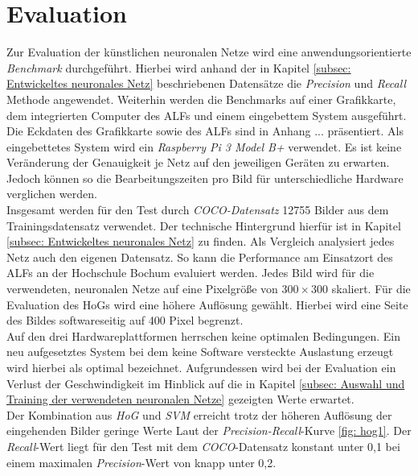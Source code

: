 \chapter{Evaluation}
\label{ch: Verifikation}
Zur Evaluation der künstlichen neuronalen Netze wird eine anwendungsorientierte \textit{Benchmark} durchgeführt. Hierbei wird anhand der in Kapitel \ref{subsec: Entwickeltes neuronales Netz} beschriebenen Datensätze die \textit{Precision} und \textit{Recall} Methode angewendet. Weiterhin werden die Benchmarks auf einer Grafikkarte, dem integrierten Computer des ALFs und einem eingebettem System ausgeführt. Die Eckdaten des Grafikkarte sowie des ALFs sind in Anhang ... präsentiert. Als eingebettetes System wird ein \textit{Raspberry Pi 3 Model B+} verwendet. Es ist keine Veränderung der Genauigkeit je Netz auf den jeweiligen Geräten zu erwarten. Jedoch können so die Bearbeitungszeiten pro Bild für unterschiedliche Hardware verglichen werden. \\

Insgesamt werden für den Test durch \textit{COCO-Datensatz} 12755 Bilder aus dem Trainingsdatensatz verwendet. Der technische Hintergrund hierfür ist in Kapitel \ref{subsec: Entwickeltes neuronales Netz} zu finden. Als Vergleich analysiert jedes Netz auch den eigenen Datensatz. So kann die Performance am Einsatzort des ALFs an der Hochschule Bochum evaluiert werden. Jedes Bild wird für die verwendeten, neuronalen Netze auf eine Pixelgröße von $300 \times 300$ skaliert. Für die Evaluation des HoGs wird eine höhere Auflösung gewählt. Hierbei wird eine Seite des Bildes softwareseitig auf 400 Pixel begrenzt.\\

Auf den drei Hardwareplattformen herrschen keine optimalen Bedingungen. Ein neu aufgesetztes System bei dem keine Software versteckte Auslastung erzeugt wird hierbei als optimal bezeichnet. Aufgrundessen wird bei der Evaluation ein Verlust der Geschwindigkeit im Hinblick auf die in Kapitel \ref{subsec: Auswahl und Training der verwendeten neuronalen Netze} gezeigten Werte erwartet.   \\
 


Der Kombination aus \textit{HoG} und \textit{SVM} erreicht trotz der höheren Auflösung der eingehenden Bilder geringe Werte Laut der \textit{Precision-Recall}-Kurve \ref{fig: hog1}. Der \textit{Recall}-Wert liegt für den Test mit dem \textit{COCO}-Datensatz konstant unter 0,1 bei einem maximalen \textit{Precision}-Wert von knapp unter 0,2.


